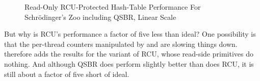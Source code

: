 \begin{figure}
\centering
{}
\caption{Read-Only RCU-Protected Hash-Table Performance For Schr\"odinger's Zoo including QSBR, Linear Scale}
\label{fig:datastruct:Read-Only RCU-Protected Hash-Table Performance For Schroedinger's Zoo including QSBR; Linear Scale}
\end{figure}

But why is RCU's performance a factor of five less than ideal?
One possibility is that the per-thread counters manipulated by
 and  are slowing things down.
therefore adds the results for the  variant of RCU, whose read-side
primitives do nothing.
And although QSBR does perform slightly better than does RCU, it is still
about a factor of five short of ideal.


